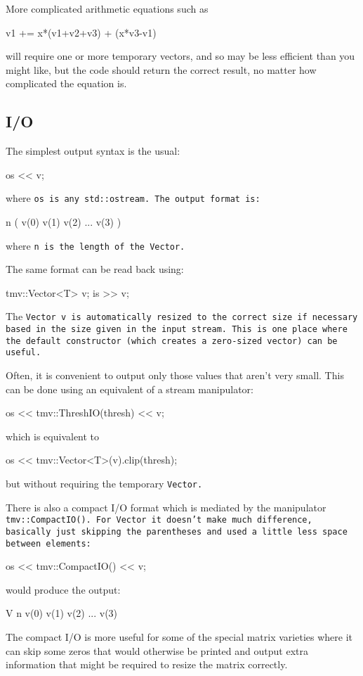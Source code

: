 More complicated arithmetic equations such as
\begin{tmvcode}
v1 += x*(v1+v2+v3) + (x*v3-v1) 
\end{tmvcode}
will require one or more temporary vectors, and so may be less efficient than 
you might like, but the code should return the correct result, no matter
how complicated the equation is.

\subsection{I/O}
\label{Vector_IO}

The simplest output syntax is the usual:
\begin{tmvcode}
os << v;
\end{tmvcode}
where \tt{os} is any \tt{std::ostream}.
The output format is:
\begin{tmvcode}
n ( v(0)  v(1)  v(2)  ...  v(3) )
\end{tmvcode}
where \tt{n} is the length of the \tt{Vector}.

The same format can be read back using:
\begin{tmvcode}
tmv::Vector<T> v;
is >> v;
\end{tmvcode}
The \tt{Vector v} is automatically resized to the correct size if necessary based in the size given in the input stream.  This is one place where the default constructor (which creates a zero-sized vector) can be useful.

Often, it is convenient to output only those values that aren't very small. 
This can be done using an equivalent of a stream manipulator:
\begin{tmvcode}
os << tmv::ThreshIO(thresh) << v;
\end{tmvcode}
which is equivalent to
\begin{tmvcode}
os << tmv::Vector<T>(v).clip(thresh);
\end{tmvcode}
but without requiring the temporary \tt{Vector}.

There is also a compact I/O format which is mediated by the manipulator
\tt{tmv::CompactIO()}.  For \tt{Vector} it doesn't make much difference, basically
just skipping the parentheses and used a little less space between elements:
\begin{tmvcode}
os << tmv::CompactIO() << v;
\end{tmvcode}
would produce the output:
\begin{tmvcode}
V n v(0) v(1) v(2) ... v(3)
\end{tmvcode}
The compact I/O is more useful for some of the special matrix varieties where it can skip 
some zeros that would otherwise be printed and output extra information that might be required
to resize the matrix correctly.

